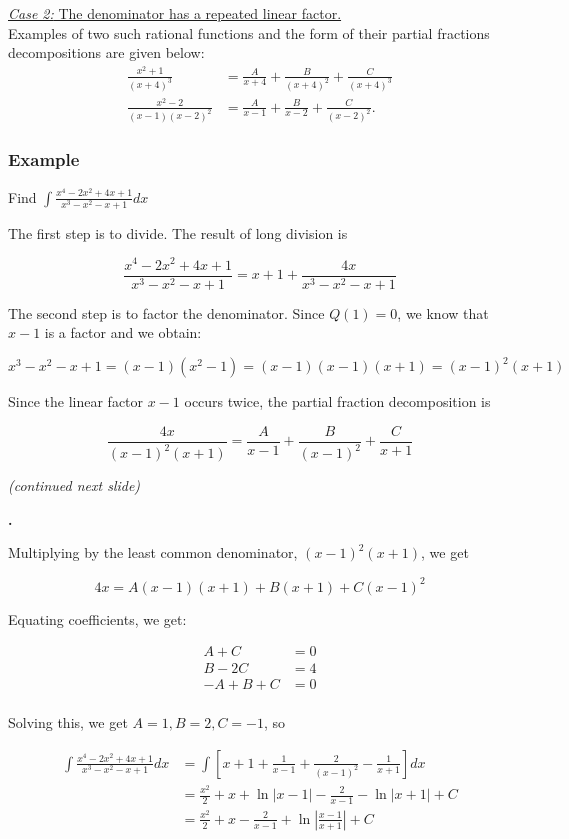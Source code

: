 \documentclass[t]{beamer}
\theoremstyle{plain}
\theoremstyle{definition}
\newcounter{heading}
\newcommand{\newhead}[1]{\medskip\stepcounter{heading}\noindent\textbf{\hspace{0.2cm}{#1}.}}
\begin{document}
\begin{frame}
\noindent\underline{\textit{Case 2:} The denominator has a repeated linear factor.}\\
Examples of two such rational functions and the form of their partial fractions decompositions are given below:
\begin{align*}
\frac{x^2+1}{(x+4)^3}&= {\frac{A}{x+4}+\frac{B}{(x+4)^2}+\frac{C}{(x+4)^3}}\\
\frac{x^2-2}{(x-1)(x-2)^2}&= {\frac{A}{x-1}+\frac{B}{x-2}+\frac{C}{(x-2)^2}}.
\end{align*}
\end{frame}

\begin{frame}
\footnotesize
\frametitle{Example}
Find $\displaystyle\int \frac{x^4 - 2x^2 + 4x + 1}{x^3 - x^2 - x + 1}dx$ \pause

\medskip

The first step is to divide.  The result of long division is

$$ \frac{x^4 - 2x^2 + 4x + 1}{x^3 - x^2 - x + 1} = x + 1 + \frac{4x}{x^3 - x^2 - x + 1}$$

The second step is to factor the denominator.  Since $Q(1) = 0$, we know that $x - 1$ is a factor and we obtain:

$$x^3 - x^2 - x + 1 = (x - 1)(x^2 - 1) = (x - 1)(x-1)(x+1) = (x-1)^2(x+1)$$

Since the linear factor $x-1$ occurs twice, the partial fraction decomposition is

$$\frac{4x}{(x-1)^2(x+1)} = \frac{A}{x-1} + \frac{B}{(x-1)^2} + \frac{C}{x + 1}$$

\textit{(continued next slide)}

\end{frame}

\begin{frame}
\footnotesize
\newhead{Continued...}

Multiplying by the least common denominator, $(x-1)^2(x+1)$, we get

$$4x = A(x-1)(x+1) + B(x + 1) + C(x-1)^2$$

Equating coefficients, we get:

\begin{align*}
A + C &= 0\\
B - 2C &= 4\\
-A + B + C &= 0\\
\end{align*}

Solving this, we get $A = 1, B = 2, C = -1$, so

\begin{align*}
\displaystyle\int \frac{x^4 - 2x^2 + 4x + 1}{x^3 - x^2 - x + 1}dx &= \int\left[x + 1 + \frac{1}{x-1} + \frac{2}{(x-1)^2} - \frac{1}{x + 1}\right]dx\\
&= \frac{x^2}{2} + x + \ln|x - 1| - \frac{2}{x-1} - \ln|x + 1| + C\\
&= \frac{x^2}{2} + x - \frac{2}{x - 1} + \ln\left|\frac{x - 1}{x + 1}\right| + C
\end{align*}

\end{frame}
\end{document}
